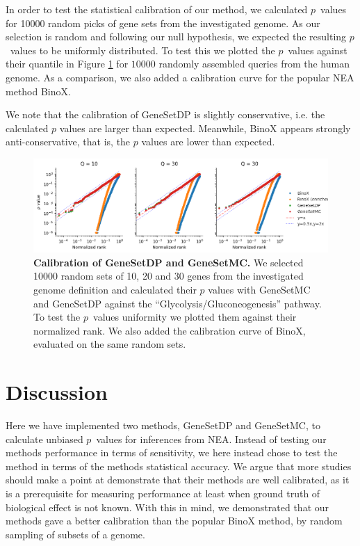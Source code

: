 \documentclass[a4paper,american]{lipics-v2016}
\begin{document}
In order to test the statistical calibration of our method, we calculated $p$~values for 10000 random picks of gene sets from the investigated genome. As our selection is random and following our null hypothesis, we expected the resulting $p$~values to be uniformly distributed. To test this we plotted the $p$~values against their quantile in Figure \ref{fig:calibration} for $10000$ randomly assembled queries from the human genome. As a comparison, we also added a calibration curve for the popular NEA method BinoX\cite{ogris2016novel}.

We note that the calibration of GeneSetDP is slightly conservative, i.e. the calculated $p$ values are larger than expected. Meanwhile, BinoX appears strongly anti-conservative, that is, the $p$ values are lower than expected.

\begin{figure}[htb]
  \begin{center}
      \includegraphics[width=1.0\textwidth]{figures/calibration_multiple.png}
  \end{center}
  \caption{{\bf Calibration of GeneSetDP and GeneSetMC.} We selected 10000 random sets of 10, 20 and 30 genes from the investigated genome definition and calculated their $p$ values with GeneSetMC and GeneSetDP against the ``Glycolysis/Gluconeogenesis'' pathway. To test the $p$~values uniformity we plotted them against their normalized rank. We also added the calibration curve of BinoX, evaluated on the same random sets.}
  \label{fig:calibration}
\end{figure}


\section*{Discussion}

Here we have implemented two methods, GeneSetDP and GeneSetMC, to calculate unbiased $p$~values for inferences from NEA.
Instead of testing our methods performance in terms of sensitivity, we here instead chose to test the method in terms of the methods statistical accuracy. We argue that more studies should make a point at demonstrate that their methods are well calibrated, as it is a prerequisite for measuring performance at least when ground truth of biological effect is not known.
With this in mind, we demonstrated that our methods gave a better calibration than the popular BinoX method, by random sampling of subsets of a genome.
\end{document}
